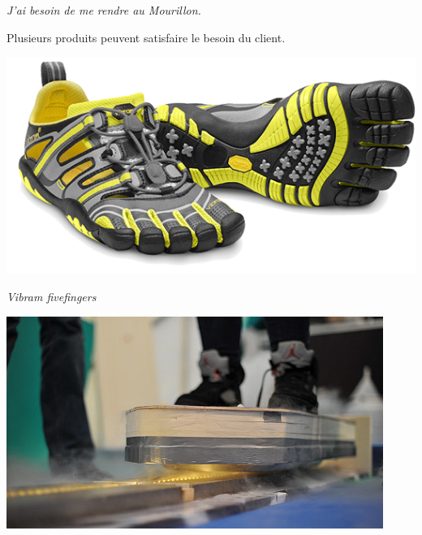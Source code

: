 \documentclass[11pt,oneside]{article}
\begin{document}
\begin{exemple}
\textit{J'ai besoin de me rendre au Mourillon.}

Plusieurs produits peuvent satisfaire le besoin du client. 

\noindent\begin{minipage}[c]{.22\linewidth}
\begin{center}
\includegraphics[width=\textwidth]{png/vibram}

\textit{Vibram fivefingers \cite{vibram}}
\end{center}
\end{minipage} \hfill
\begin{minipage}[c]{.22\linewidth}
\begin{center}
\includegraphics[width=.9\textwidth]{png/magsurf}


\end{center}
\end{minipage}
\end{exemple}
\end{document}
